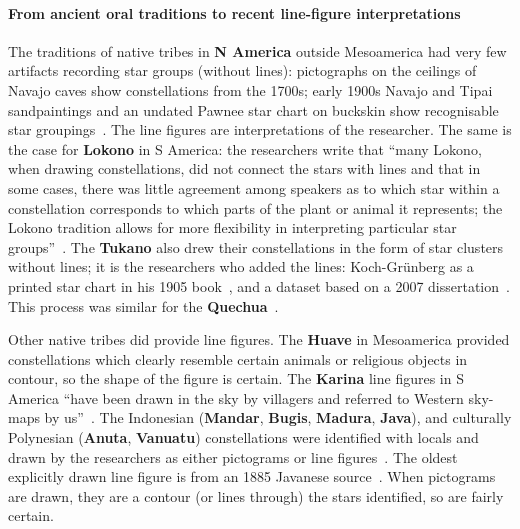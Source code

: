 \documentclass[10pt]{article}
\begin{document}
\paragraph{From ancient oral traditions to recent line-figure interpretations} The traditions of native tribes in {\bf N America} outside Mesoamerica had very few artifacts recording star groups (without lines): pictographs on the ceilings of Navajo caves show constellations from the 1700s; early 1900s Navajo and Tipai sandpaintings and an undated Pawnee star chart on buckskin show recognisable star groupings~\cite{buckstaff1927stars,miller1997stars}. The line figures are interpretations of the researcher. The same is the case for {\bf Lokono} in S America: the researchers write that ``many Lokono, when drawing constellations, did not connect the stars with lines and that in some cases, there was little agreement among speakers as to which star within a constellation corresponds to which parts of the plant or animal it represents; the Lokono tradition allows for more flexibility in interpreting particular star groups''~\cite{rybka2018lokono}. The {\bf Tukano} also drew their constellations in the form of star clusters without lines; it is the researchers who added the lines: Koch-Gr{\"u}nberg as a printed star chart in his 1905 book~\cite{koch1905anfange}, and a dataset based on a 2007 dissertation~\cite{cardoso2007ceu}. This process was similar for the {\bf Quechua}~\cite{urton1978beasts}. 

Other native tribes did provide line figures. The {\bf Huave} in Mesoamerica provided constellations which clearly resemble certain animals or religious objects in contour, so the shape of the figure is certain. The {\bf Kari{\textquotesingle}na} line figures in S America ``have been drawn in the sky by villagers and referred to Western sky-maps by us''~\cite{magana1982carib}. The Indonesian ({\bf Mandar}, {\bf Bugis}, {\bf Madura}, {\bf Java}), and culturally Polynesian ({\bf Anuta}, {\bf Vanuatu}) constellations were identified with locals and drawn by the researchers as either pictograms or line figures~\cite{fatima2021madura,van1885astronomie,khairuddin2021austronesian,orchiston2021seasia,fatima2021madura,feinberg1988polynesian,DMR}. The oldest explicitly drawn line figure is from an 1885 Javanese source~\cite{van1885astronomie}. When pictograms are drawn, they are a contour (or lines through) the stars identified, so are fairly certain.
\end{document}
